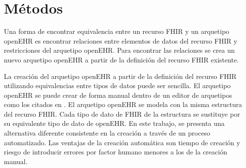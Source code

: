 \section{Métodos}

Una forma de encontrar equivalencia entre un recurso FHIR y un arquetipo openEHR es encontrar relaciones entre elementos de datos del recurso FHIR y restricciones del arquetipo openEHR. Para encontrar las relaciones se crea un nuevo arquetipo openEHR a partir de la definición del recurso FHIR existente.

La creación del arquetipo openEHR a partir de la definición del recurso FHIR utilizando equivalencias entre tipos de datos puede ser sencilla. El arquetipo openEHR se puede crear de forma manual dentro de un editor de arquetipos como los citados en \cite{openEHRModellingTools}. El arquetipo openEHR se modela con la misma estructura del recurso FHIR. Cada tipo de dato de FHIR de la estructura se sustituye por su equivalente tipo de dato de openEHR. En este trabajo, se presenta una alternativa diferente consistente en la creación a través de un proceso automatizado. Las ventajas de la creación automática son tiempo de creación y riesgo de introducir errores por factor humano menores a los de la creación manual.




